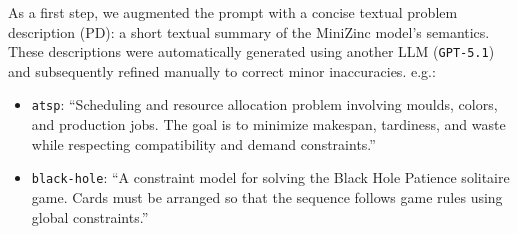 \documentclass[../../main]{subfiles}
\begin{document}
As a first step, we augmented the prompt with a concise textual problem description (PD): a short textual summary of the MiniZinc model's semantics. These descriptions were automatically generated using another LLM (\texttt{GPT-5.1}) and subsequently refined manually to correct minor inaccuracies. e.g.:
\begin{itemize}
    \item \texttt{atsp}: ``Scheduling and resource allocation problem involving moulds, colors, and production jobs. The goal is to minimize makespan, tardiness, and waste while respecting compatibility and demand constraints.''
    \item \texttt{black-hole}: ``A constraint model for solving the Black Hole Patience solitaire game. Cards must be arranged so that the sequence follows game rules using global constraints.''
\end{itemize}
\end{document}
